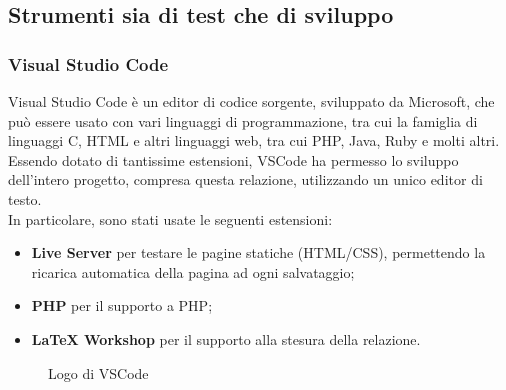 \documentclass[]{article}
\begin{document}
\subsection{Strumenti sia di test che di sviluppo}
\subsubsection*{Visual Studio Code}
Visual Studio Code è un editor di codice sorgente, sviluppato da Microsoft, che può essere usato con vari linguaggi di programmazione, tra cui la famiglia di linguaggi C, HTML e altri linguaggi web, tra cui PHP, Java, Ruby e molti altri.\\
Essendo dotato di tantissime estensioni, VSCode ha permesso lo sviluppo dell'intero progetto, compresa questa relazione, utilizzando un unico editor di testo.\\
In particolare, sono stati usate le seguenti estensioni:
\begin{itemize}
	\item \textbf{Live Server} per testare le pagine statiche (HTML/CSS), permettendo la ricarica automatica della pagina ad ogni salvataggio;
	\item \textbf{PHP} per il supporto a PHP;
	\item \textbf{LaTeX Workshop} per il supporto alla stesura della relazione.
\end{itemize}
\begin{figure}[H]
	\centering
	\caption{Logo di VSCode}
\end{figure}
\end{document}
